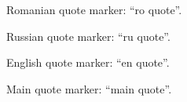 \documentclass[a4paper,12pt]{report}
\begin{document}
Romanian quote marker: \enquote{ro quote}.

Russian quote marker: \enquote{ru quote}.

English quote marker: \enquote{en quote}.

\introChapter
Main quote marker: \enquote{main quote}.
\end{document}
